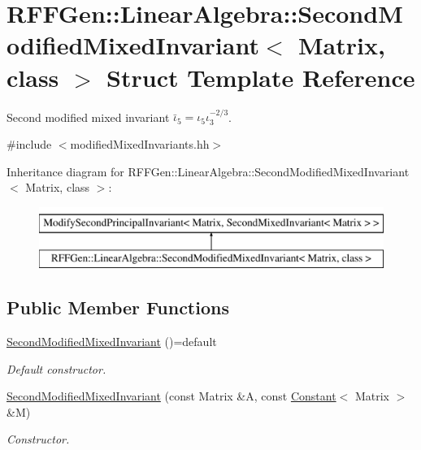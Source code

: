 \hypertarget{structRFFGen_1_1LinearAlgebra_1_1SecondModifiedMixedInvariant}{\section{R\-F\-F\-Gen\-:\-:Linear\-Algebra\-:\-:Second\-Modified\-Mixed\-Invariant$<$ Matrix, class $>$ Struct Template Reference}
\label{structRFFGen_1_1LinearAlgebra_1_1SecondModifiedMixedInvariant}
}


Second modified mixed invariant $\bar\iota_5=\iota_5\iota_3^{-2/3}$.  




{\ttfamily \#include $<$modified\-Mixed\-Invariants.\-hh$>$}

Inheritance diagram for R\-F\-F\-Gen\-:\-:Linear\-Algebra\-:\-:Second\-Modified\-Mixed\-Invariant$<$ Matrix, class $>$\-:\begin{figure}[H]
\begin{center}
\leavevmode
\includegraphics[height=2.000000cm]{structRFFGen_1_1LinearAlgebra_1_1SecondModifiedMixedInvariant}
\end{center}
\end{figure}
\subsection*{Public Member Functions}
\begin{DoxyCompactItemize}
\item 
\hypertarget{structRFFGen_1_1LinearAlgebra_1_1SecondModifiedMixedInvariant_a616648819b50566888bbd3ecce020db0}{\hyperlink{structRFFGen_1_1LinearAlgebra_1_1SecondModifiedMixedInvariant_a616648819b50566888bbd3ecce020db0}{Second\-Modified\-Mixed\-Invariant} ()=default}\label{structRFFGen_1_1LinearAlgebra_1_1SecondModifiedMixedInvariant_a616648819b50566888bbd3ecce020db0}

\begin{DoxyCompactList}\small\item\em Default constructor. \end{DoxyCompactList}\item 
\hyperlink{structRFFGen_1_1LinearAlgebra_1_1SecondModifiedMixedInvariant_aa23bb41771ecbde5618a83dfb2555ecd}{Second\-Modified\-Mixed\-Invariant} (const Matrix \&A, const \hyperlink{structRFFGen_1_1Constant}{Constant}$<$ Matrix $>$ \&M)
\begin{DoxyCompactList}\small\item\em Constructor. \end{DoxyCompactList}\end{DoxyCompactItemize}


